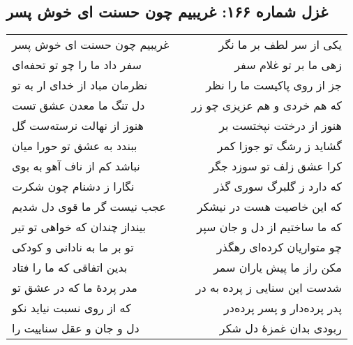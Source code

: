 \begin{center}
\section*{غزل شماره ۱۶۶: غریبیم چون حسنت ای خوش پسر}
\label{sec:166}
\begin{longtable}{l p{0.5cm} r}
غریبیم چون حسنت ای خوش پسر
&&
یکی از سر لطف بر ما نگر
\\
سفر داد ما را چو تو تحفه‌ای
&&
زهی ما بر تو غلام سفر
\\
نظرمان مباد از خدای ار به تو
&&
جز از روی پاکیست ما را نظر
\\
دل تنگ ما معدن عشق تست
&&
که هم خردی و هم عزیزی چو زر
\\
هنوز از نهالت نرسته‌ست گل
&&
هنوز از درختت نپختست بر
\\
ببندد به عشق تو حورا میان
&&
گشاید ز رشگ تو جوزا کمر
\\
نباشد کم از ناف آهو به بوی
&&
کرا عشق زلف تو سوزد جگر
\\
نگارا ز دشنام چون شکرت
&&
که دارد ز گلبرگ سوری گذر
\\
عجب نیست گر ما قوی دل شدیم
&&
که این خاصیت هست در نیشکر
\\
بینداز چندان که خواهی تو تیر
&&
که ما ساختیم از دل و جان سپر
\\
تو بر ما به نادانی و کودکی
&&
چو متواریان کرده‌ای رهگذر
\\
بدین اتفاقی که ما را فتاد
&&
مکن راز ما پیش یاران سمر
\\
مدر پردهٔ ما که در عشق تو
&&
شدست این سنایی ز پرده به در
\\
که از روی نسبت نیاید نکو
&&
پدر پرده‌دار و پسر پرده‌در
\\
دل و جان و عقل سناییت را
&&
ربودی بدان غمزهٔ دل شکر
\\
\end{longtable}
\end{center}
